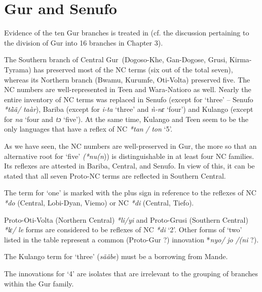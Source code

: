 \clearpage
\section{Gur and Senufo}%

Evidence of the ten Gur branches is treated in  (cf. the discussion pertaining to the division of Gur into 16 branches in Chapter 3). 

The Southern branch of Central Gur~(Dogoso-Khe, Gan-Dogose, Grusi, Kirma-Tyrama) has preserved most of the NC terms (six out of the total seven), whereas its Northern branch (Bwamu, Kurumfe, Oti-Volta) preserved five. The NC numbers are well-represented in Teen and Wara-Natioro as well. Nearly the entire inventory of NC terms was replaced in Senufo (except for ‘three’ – Senufo \textit{*t{\~{\`a}}{\~{a}}/} \textit{taàr}), Bariba (except for \textit{i-ta} `three' and \textit{{\`{n}}-nɛ} ‘four’) and Kulango (except for \textit{na} ‘four and \textit{tɔ} ‘five’). At the same time, Kulango and Teen seem to be the only languages that have a reflex of NC \textit{*tan} \textit{/} \textit{ton} ‘5’. 

As we have seen, the NC numbers are well-preserved in Gur, the more so that an alternative root for ‘five’ \textit{(*nu}\textit{(n})) is distinguishable in at least four NC families. Its reflexes are attested in Bariba, Central, and Senufo. In view of this, it can be stated that all seven Proto-NC terms are reflected in Southern Central. 

The term for ‘one’ is marked with the plus sign in reference to the reflexes of NC \textit{*do} (Central, Lobi-Dyan, Viemo) or NC \textit{*di} (Central, Tiefo).

Proto-Oti-Volta (Northern Central) \textit{*li/yi} and Proto-Grusi (Southern Central) \textit{*lɛ/} \textit{le} forms are considered to be reflexes of NC \textit{*di} ‘2’. Other forms of ‘two’ listed in the table represent a common (Proto-Gur ?) innovation  *\textit{nyo/} \textit{jo} \textit{/(ni} ?).

The Kulango term for ‘three’ (\textit{s{\~{a}}{\~{a}}be}) must be a borrowing from Mande.

The innovations for ‘4’ are isolates that are irrelevant to the grouping of branches within the Gur family. 

